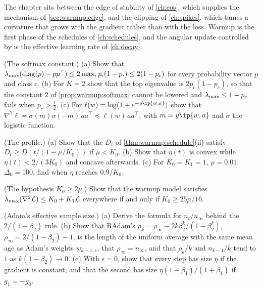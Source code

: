 \begin{refsection}
The chapter sits between the edge of stability of \cref{ch:eos}, which supplies the mechanism of \cref{sec:warmup:edge}, and the clipping of \cref{ch:spikes}, which tames a curvature that grows with the gradient rather than with the loss. Warmup is the first phase of the schedules of \cref{ch:schedules}, and the angular update controlled by \textcite{KossonMessmerJaggi2024} is the effective learning rate of \cref{ch:decay}.

\begin{exercises}
\item \consolidation (The softmax constant.) (a) Show that $\lambda_{\max}(\operatorname{diag}(p)-pp^\top)\le2\max_ip_i(1-p_i)\le2(1-p_c)$ for every probability vector $p$ and class $c$. (b) For $K=2$ show that the top eigenvalue is $2p_c(1-p_c)$, so that the constant $2$ of \cref{prop:warmup:softmax} cannot be lowered and $\lambda_{\max}\le1-p_c$ fails when $p_c>\frac12$. (c) For $\ell(w)=\log(1+e^{-y\ip{w,a}})$ show that $\nabla^2\ell=\sigma(m)\sigma(-m)\,aa^\top\preceq\ell(w)\,aa^\top$, with $m=y\ip{w,a}$ and $\sigma$ the logistic function.\label{ex:warmup:softmax}

\item \consolidation (The profile.) (a) Show that the $D_t$ of \cref{thm:warmup:schedule}(ii) satisfy $D_t\ge D(t/(1-\mu/K_0))$ if $\mu<K_0$.  (b) Show that $\eta(t)$ is convex while $\eta(t)<2/(3K_0)$ and concave afterwards.  (c) For $K_0=K_1=1$, $\mu=0.01$, $\Delta_0=100$, find when $\eta$ reaches $0.9/K_0$.\label{ex:warmup:profile}

\item \consolidation\hard (The hypothesis $K_0\ge2\mu$.) Show that the warmup model satisfies $\lambda_{\max}(\nabla^2\mathcal{L})\le K_0+K_1\mathcal{L}$ everywhere if and only if $K_0\ge25\mu/16$. \label{ex:warmup:threshold}

\item \consolidation (Adam's effective sample size.) (a) Derive the formula for $n_t/n_\infty$ behind the $2/(1-\beta_2)$ rule. (b) Show that RAdam's $\rho_k=\rho_\infty-2k\beta_2^k/(1-\beta_2^k)$, $\rho_\infty=2/(1-\beta_2)-1$, is the length of the uniform average with the same mean age as Adam's weights $w_{k-1,s}$, that $\rho_\infty=n_\infty$, and that $\rho_k/k$ and $n_{k-1}/k$ tend to $1$ as $k(1-\beta_2)\to0$. (c) With $\epsilon=0$, show that every step has size $\eta$ if the gradient is constant, and that the second has size $\eta(1-\beta_1)/(1+\beta_1)$ if $g_1=-g_0$.\label{ex:warmup:neffex}


\end{exercises}
\end{refsection}
